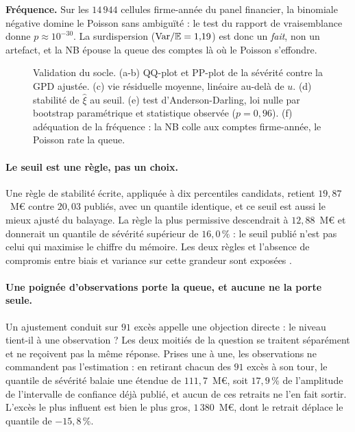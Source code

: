 \textbf{Fréquence.} Sur les $14\,944$ cellules firme-année du panel financier, la binomiale
négative domine le Poisson sans ambiguïté : le test du rapport de vraisemblance donne
$p\approx 10^{-30}$. La surdispersion ($\mathrm{Var}/\mathbb{E}=1{,}19$) est donc un \emph{fait}, non un
artefact, et la NB épouse la queue des comptes là où le Poisson s'effondre.

\begin{figure}[htbp]\centering
{}
\caption{Validation du socle. (a-b) QQ-plot et PP-plot de la sévérité contre la GPD
ajustée. (c) vie résiduelle moyenne, linéaire au-delà de $u$. (d) stabilité
de $\hat\xi$ au seuil. (e) test d'Anderson-Darling, loi nulle par bootstrap
paramétrique et statistique observée ($p=0{,}96$). (f) adéquation de la fréquence :
la NB colle aux comptes firme-année, le Poisson rate la queue.}
\label{soc:fig:validation}
\end{figure}

\paragraph{Le seuil est une règle, pas un choix.} Une règle de stabilité écrite, appliquée à dix
percentiles candidats, retient $19{,}87$~M\euro{} contre $20{,}03$ publiés, avec un quantile
identique, et ce seuil est aussi le mieux ajusté du balayage. La règle la plus permissive
descendrait à $12{,}88$~M\euro{} et donnerait un quantile de sévérité supérieur de $16{,}0\,\%$ :
le seuil publié n'est pas celui qui maximise le chiffre du mémoire. Les deux règles et l'absence
de compromis entre biais et variance sur cette grandeur sont exposées \matcomp.

\paragraph{Une poignée d'observations porte la queue, et aucune ne la porte seule.} Un
ajustement conduit sur $91$ excès appelle une objection directe : le niveau tient-il à une
observation ? Les deux moitiés de la question se traitent séparément et ne reçoivent pas la
même réponse. Prises une à une, les observations ne commandent pas l'estimation : en retirant
chacun des $91$ excès à son tour, le quantile de sévérité balaie une étendue de
$111{,}7$~M\euro, soit $17{,}9\,\%$ de l'amplitude de l'intervalle de confiance déjà publié, et
aucun de ces retraits ne l'en fait sortir. L'excès le plus influent est bien le plus gros,
$1\,380$~M\euro, dont le retrait déplace le quantile de $-15{,}8\,\%$.

